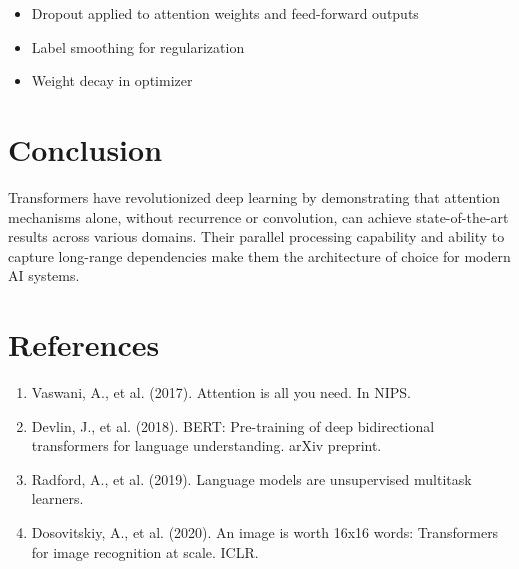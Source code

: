 \documentclass[12pt,a4paper]{article}
\begin{document}
\begin{itemize}
    \item Dropout applied to attention weights and feed-forward outputs
    \item Label smoothing for regularization
    \item Weight decay in optimizer
\end{itemize}

\section{Conclusion}

Transformers have revolutionized deep learning by demonstrating that attention mechanisms alone, without recurrence or convolution, can achieve state-of-the-art results across various domains. Their parallel processing capability and ability to capture long-range dependencies make them the architecture of choice for modern AI systems.

\section{References}

\begin{enumerate}
    \item Vaswani, A., et al. (2017). Attention is all you need. In NIPS.
    \item Devlin, J., et al. (2018). BERT: Pre-training of deep bidirectional transformers for language understanding. arXiv preprint.
    \item Radford, A., et al. (2019). Language models are unsupervised multitask learners.
    \item Dosovitskiy, A., et al. (2020). An image is worth 16x16 words: Transformers for image recognition at scale. ICLR.
\end{enumerate}
\end{document}
